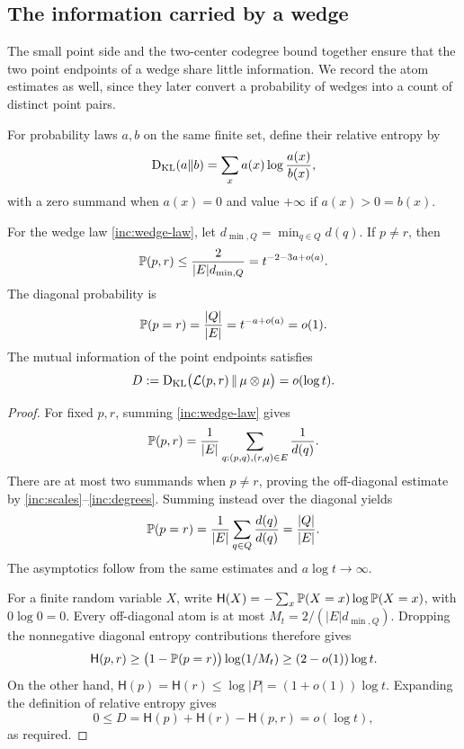 \subsection{The information carried by a wedge}

The small point side and the two-center codegree bound together ensure
that the two point endpoints of a wedge share little information. We
record the atom estimates as well, since they later convert a probability
of wedges into a count of distinct point pairs.

For probability laws \(a,b\) on the same finite set, define their relative
entropy by
\begin{equation}\label{inc:relative-entropy}
 \operatorname{D_{\mathrm{KL}}}(a\Vert b)=\sum_x a(x)\log\frac{a(x)}{b(x)},
\end{equation}
with a zero summand when \(a(x)=0\) and value \(+\infty\) if
\(a(x)>0=b(x)\).

\begin{lemma}\label{inc:entropy}
For the wedge law \eqref{inc:wedge-law}, let
\(d_{\min,Q}=\min_{q\in Q}d(q)\). If \(p\ne r\), then
\begin{equation}\label{inc:wedge-atoms}
 \mathbb P(p,r)\le\frac{2}{|E|d_{\min,Q}}
                 =t^{-2-3a+o(a)}.
\end{equation}
The diagonal probability is
\begin{equation}\label{inc:wedge-diagonal}
 \mathbb P(p=r)=\frac{|Q|}{|E|}=t^{-a+o(a)}=o(1).
\end{equation}
The mutual information of the point endpoints satisfies
\begin{equation}\label{inc:information-bound}
 D:=\operatorname{D_{\mathrm{KL}}}\bigl(\mathcal L(p,r)\,\Vert\,\mu\otimes\mu\bigr)
   =o(\log t).
\end{equation}
\end{lemma}

\begin{proof}
For fixed \(p,r\), summing \eqref{inc:wedge-law} gives
\[
 \mathbb P(p,r)=\frac1{|E|}
       \sum_{q:(p,q),(r,q)\in E}\frac1{d(q)}.
\]
There are at most two summands when \(p\ne r\), proving the
off-diagonal estimate by \eqref{inc:scales}--\eqref{inc:degrees}.
Summing instead over the diagonal yields
\[
 \mathbb P(p=r)=\frac1{|E|}\sum_{q\in Q}
                 \frac{d(q)}{d(q)}=\frac{|Q|}{|E|}.
\]
The asymptotics follow from the same estimates and
\(a\log t\to\infty\).

For a finite random variable \(X\), write
\(\mathsf H(X)=-\sum_x\mathbb P(X=x)\log\mathbb P(X=x)\), with
\(0\log0=0\). Every off-diagonal atom is at most
\(M_t=2/(|E|d_{\min,Q})\). Dropping the nonnegative diagonal
entropy contributions therefore gives
\[
 \mathsf H(p,r)
 \ge\bigl(1-\mathbb P(p=r)\bigr)\log(1/M_t)
 \ge(2-o(1))\log t.
\]
On the other hand,
\(\mathsf H(p)=\mathsf H(r)\le\log|P|
=(1+o(1))\log t\). Expanding the definition of relative entropy
gives
\[
 0\le D=\mathsf H(p)+\mathsf H(r)-\mathsf H(p,r)
       =o(\log t),
\]
as required.
\end{proof}

